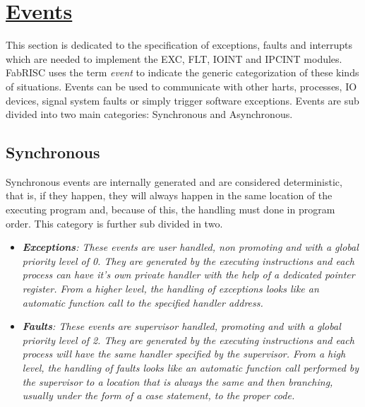 \section[Events]{\LARGE\underline{Events}}

    \vspace{10pt}

    This section is dedicated to the specification of exceptions, faults and interrupts which are needed to implement the EXC, FLT, IOINT and IPCINT modules. FabRISC uses the term \textit{event} to indicate the generic categorization of these kinds of situations. Events can be used to communicate with other harts, processes, IO devices, signal system faults or simply trigger software exceptions. Events are sub divided into two main categories: Synchronous and Asynchronous.

    \subsection{Synchronous}

        \vspace{10pt}

        Synchronous events are internally generated and are considered deterministic, that is, if they happen, they will always happen in the same location of the executing program and, because of this, the handling must done in program order. This category is further sub divided in two.

        \begin{itemize}

            \item \textit{\textbf{Exceptions}: These events are user handled, non promoting and with a global priority level of 0. They are generated by the executing instructions and each process can have it's own private handler with the help of a dedicated pointer register. From a higher level, the handling of exceptions looks like an automatic function call to the specified handler address.}

            \item \textit{\textbf{Faults}: These events are supervisor handled, promoting and with a global priority level of 2. They are generated by the executing instructions and each process will have the same handler specified by the supervisor. From a high level, the handling of faults looks like an automatic function call performed by the supervisor to a location that is always the same and then branching, usually under the form of a case statement, to the proper code.}

        \end{itemize}

